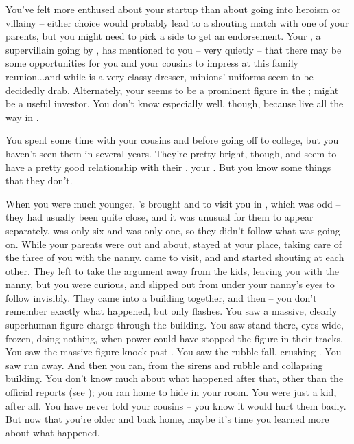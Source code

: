 \documentclass[char]{LRSguildcamp1}
\begin{document}
You've felt more enthused about your startup than about going into heroism or villainy -- either choice would probably lead to a shouting match with one of your parents, but you might need to pick a side to get an endorsement.  Your \cGrandma{\grandparent} \cGrandma{}, a supervillain going by \cGrandma{\MYsupername}, has mentioned to you -- very quietly -- that there may be some opportunities for you and your cousins to impress \cGrandma{\them} at this family reunion...and while \cGrandma{} \cGrandma{\themself} is a very classy dresser, \cGrandma{\their} minions' uniforms seem to be decidedly drab.  Alternately, your \cYoungest{\uncle} \cYoungest{} seems to be a prominent figure in the \cHeroLeague{\intro}; \cYoungest{\they} might be a useful investor.  You don't know \cYoungest{\them} especially well, though, because \cYoungest{\they} live all the way in \pCityYoungest{}. 

You spent some time with your cousins \cTeen{} and \cTween{} before going off to college, but you haven't seen them in several years.  They're pretty bright, though, and seem to have a pretty good relationship with their \cArchitect{\parent}, your \cArchitect{\uncle} \cArchitect{}.  But you know some things that they don't.

When you were much younger, \cArchitect{}'s \cAS{\spouse} \cAS{} brought \cTeen{} and \cTween{} to visit you in \pCityO{}, which was odd -- they had usually been quite close, and it was unusual for them to appear separately.  \cTeen{} was only six and \cTween{} was only one, so they didn't follow what was going on.  While your parents were out and about, \cAS{} stayed at your place, taking care of the three of you with the nanny.  \cArchitect{} came to visit, and \cArchitect{\they} and \cAS{} started shouting at each other.  They left to take the argument away from the kids, leaving you with the nanny, but you were curious, and slipped out from under your nanny's eyes to follow invisibly.  They came into a building  together, and then -- you don't remember exactly what happened, but only flashes.  You saw a massive, clearly superhuman figure charge through the building.  You saw \cArchitect{} stand there, eyes wide, frozen, doing nothing, when \cArchitect{\their} power could have stopped the figure in their tracks. You saw the massive figure knock past \cAS{}.  You saw the rubble fall, crushing \cAS{}.  You saw \cArchitect{} run away.  And then you ran, from the sirens and rubble and collapsing building.  You don't know much about what happened after that, other than the official reports (see \bChicagoIncident{}); you ran home to hide in your room.  You were just a kid, after all.
  You have never told your cousins -- you know it would hurt them badly.  But now that you're older and back home, maybe it's time you learned more about what happened. 
\end{document}
